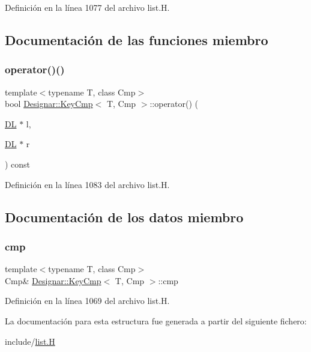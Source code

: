 Definición en la línea 1077 del archivo list.\+H.



\subsection{Documentación de las funciones miembro}
\mbox{\label{struct_designar_1_1_key_cmp_aa48c4fb700b4ba3bd243c3426288455e}} 
\subsubsection{\texorpdfstring{operator()()}{operator()()}}
{\footnotesize\ttfamily template$<$typename T, class Cmp$>$ \\
bool \hyperlink{struct_designar_1_1_key_cmp}{Designar\+::\+Key\+Cmp}$<$ T, Cmp $>$\+::operator() (\begin{DoxyParamCaption}\item[{\hyperlink{class_designar_1_1_d_l}{DL} $\ast$}]{l,  }\item[{\hyperlink{class_designar_1_1_d_l}{DL} $\ast$}]{r }\end{DoxyParamCaption}) const\hspace{0.3cm}{\ttfamily [inline]}}



Definición en la línea 1083 del archivo list.\+H.



\subsection{Documentación de los datos miembro}
\mbox{\label{struct_designar_1_1_key_cmp_a459613d03deb91c821f26cfafdd93dab}} 
\subsubsection{\texorpdfstring{cmp}{cmp}}
{\footnotesize\ttfamily template$<$typename T, class Cmp$>$ \\
Cmp\& \hyperlink{struct_designar_1_1_key_cmp}{Designar\+::\+Key\+Cmp}$<$ T, Cmp $>$\+::cmp}



Definición en la línea 1069 del archivo list.\+H.



La documentación para esta estructura fue generada a partir del siguiente fichero\+:\begin{DoxyCompactItemize}
\item 
include/\hyperlink{list_8_h}{list.\+H}\end{DoxyCompactItemize}

